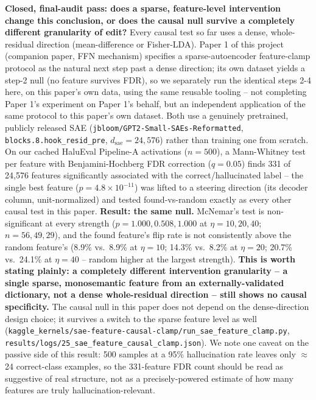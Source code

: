 \documentclass[10pt,twocolumn]{article}
\begin{document}
\textbf{Closed, final-audit pass: does a sparse, feature-level
intervention change this conclusion, or does the causal null survive a
completely different granularity of edit?} Every causal test so far
uses a dense, whole-residual direction (mean-difference or Fisher-LDA).
Paper 1 of this project (companion paper, FFN mechanism) specifies a
sparse-autoencoder feature-clamp protocol as the natural next step past
a dense direction; its own dataset yields a step-2 null (no feature
survives FDR), so we separately run the identical steps 2-4 here, on
this paper's own data, using the same reusable tooling -- not completing
Paper 1's experiment on Paper 1's behalf, but an independent application
of the same protocol to this paper's own dataset. Both use a genuinely
pretrained, publicly released SAE
(\texttt{jbloom/GPT2-Small-SAEs-Reformatted},
\texttt{blocks.8.hook\_resid\_pre}, $d_{\text{sae}}=24{,}576$) rather
than training one from scratch. On our cached HaluEval Pipeline-A
activations ($n=500$), a Mann-Whitney test per feature with
Benjamini-Hochberg FDR correction ($q=0.05$) finds 331 of 24,576
features significantly associated with the correct/hallucinated label
-- the single best feature ($p=4.8\times10^{-11}$) was lifted to a
steering direction (its decoder column, unit-normalized) and tested
found-vs-random exactly as every other causal test in this paper.
\textbf{Result: the same null.} McNemar's test is non-significant at
every strength ($p=1.000, 0.508, 1.000$ at $\eta=10,20,40$; $n=56, 49,
29$), and the found feature's flip rate is not consistently above the
random feature's (8.9\% vs.\ 8.9\% at $\eta=10$; 14.3\% vs.\ 8.2\% at
$\eta=20$; 20.7\% vs.\ 24.1\% at $\eta=40$ -- random higher at the
largest strength). \textbf{This is worth stating plainly: a completely
different intervention granularity -- a single sparse, monosemantic
feature from an externally-validated dictionary, not a dense
whole-residual direction -- still shows no causal specificity.} The
causal null in this paper does not depend on the dense-direction
design choice; it survives a switch to the sparse feature level as
well (\texttt{kaggle\_kernels/sae-feature-causal-clamp/run\_sae\_feature\_clamp.py},
\texttt{results/logs/25\_sae\_feature\_causal\_clamp.json}). We note
one caveat on the passive side of this result: 500 samples at a 95\%
hallucination rate leaves only $\approx$24 correct-class examples, so
the 331-feature FDR count should be read as suggestive of real
structure, not as a precisely-powered estimate of how many features
are truly hallucination-relevant.
\end{document}
